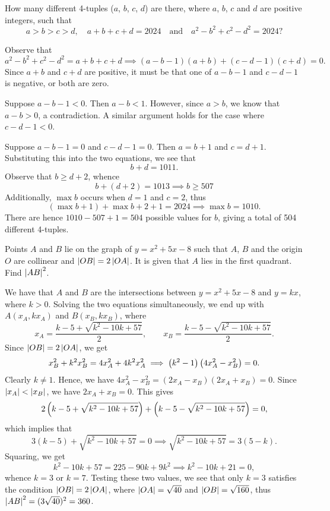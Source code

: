 \begin{question}[504]\label{Q::2024-J-1-21}
    How many different 4-tuples ($a$, $b$, $c$, $d$) are there, where $a$, $b$, $c$ and $d$ are positive integers, such that \[a > b > c > d, \quad a + b + c + d = 2024 \quad \text{and} \quad a^2 - b^2 + c^2 - d^2 = 2024?\]
\end{question}
\begin{solution*}
    Observe that \[a^2 - b^2 + c^2 - d^2 = a + b + c + d \implies (a-b-1)(a+b) + (c-d-1)(c+d) = 0.\] Since $a+b$ and $c+d$ are positive, it must be that one of $a-b-1$ and $c-d-1$ is negative, or both are zero.
    
     Suppose $a - b - 1 < 0$. Then $a - b < 1$. However, since $a > b$, we know that $a - b > 0$, a contradiction. A similar argument holds for the case where $c - d - 1 < 0$.

     Suppose $a - b - 1 = 0$ and $c - d - 1 = 0$. Then $a = b+1$ and $c = d + 1$. Substituting this into the two equations, we see that \[b + d = 1011.\] Observe that $b \geq d + 2$, whence \[b + (d+2) = 1013 \implies b \geq 507\] Additionally, $\max b$ occurs when $d = 1$ and $c = 2$, thus \[(\max b + 1) + \max b + 2 + 1 = 2024 \implies \max b = 1010.\] There are hence $1010-507+1 = 504$ possible values for $b$, giving a total of 504 different 4-tuples.
\end{solution*}

\begin{question}[360]\label{Q::2024-J-1-22}
    Points $A$ and $B$ lie on the graph of $y = x^2 + 5x - 8$ such that $A$, $B$ and the origin $O$ are collinear and $\left\lvert OB \right\rvert = 2\left\lvert OA \right\rvert$. It is given that $A$ lies in the first quadrant. Find $\left\lvert AB \right\rvert^2$.
\end{question}
\begin{solution*}
    We have that $A$ and $B$ are the intersections between $y = x^2 + 5x - 8$ and $y = kx$, where $k > 0$. Solving the two equations simultaneously, we end up with $A(x_A, kx_A)$ and $B(x_B, kx_B)$, where \[x_A = \frac{k-5 + \sqrt{k^2 - 10k + 57}}{2}, \qquad x_B = \frac{k-5 - \sqrt{k^2 - 10k + 57}}{2}.\] Since $\left\lvert OB \right\rvert = 2\left\lvert OA \right\rvert$, we get \[x_B^2 + k^2x_B^2 = 4x_A^2 + 4k^2 x_A^2 \implies \left( k^2 - 1 \right)\left( 4x_A^2 - x_B^2 \right) = 0.\] Clearly $k \neq 1$. Hence, we have $4x_A^2 - x_B^2 = (2x_A - x_B)(2x_A + x_B) = 0$. Since $\left\lvert x_A \right\rvert < \left\lvert x_B \right\rvert$, we have $2x_A + x_B = 0$. This gives \[2\left( k-5 + \sqrt{k^2 - 10k + 57} \right) + \left( k-5 - \sqrt{k^2 - 10k + 57} \right) = 0,\] which implies that \[3(k - 5) + \sqrt{k^2 - 10k + 57} = 0 \implies \sqrt{k^2 - 10k + 57} = 3(5 - k).\] Squaring, we get \[k^2 - 10k + 57 = 225 - 90k + 9k^2 \implies k^2 - 10k + 21 = 0,\] whence $k = 3$ or $k = 7$. Testing these two values, we see that only $k = 3$ satisfies the condition $\left\lvert OB \right\rvert = 2\left\lvert OA \right\rvert$, where $\left\lvert OA \right\rvert = \sqrt{40}$ and $\left\lvert OB \right\rvert = \sqrt{160}$, thus $\left\lvert AB \right\rvert^2 = (3\sqrt{40})^2 = 360$.
\end{solution*}

